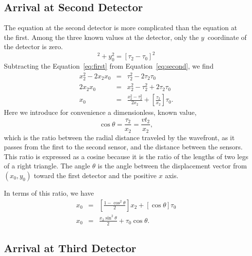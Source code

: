 \documentclass[twocolumn]{article}
\begin{document}
\subsection{Arrival at Second Detector}

The equation at the second detector is more complicated than the equation at
the first.  Among the three known values at the detector, only the
$y$~coordinate of the detector is zero.
\begin{equation}
   [x_2 - x_0]^2 + y_0^2 = [\tau_2 - \tau_0]^2
   \label{eq:second}
\end{equation}
Subtracting the Equation~\ref{eq:first} from Equation~\ref{eq:second}, we find
\begin{eqnarray}
   \nonumber
   x_2^2 - 2 x_2 x_0 &=& \tau_2^2 - 2 \tau_2 \tau_0\\
   \nonumber
   2 x_2 x_0 &=& x_2^2 - \tau_2^2 + 2 \tau_2 \tau_0\\
   x_0 &=& \frac{x_2^2 - \tau_2^2}{2 x_2} + \left[\frac{\tau_2}{x_2}\right]
   \tau_0.
\end{eqnarray}
Here we introduce for convenience a dimensionless, known value,
\begin{equation}
   \cos\theta = \frac{\tau_2}{x_2} = \frac{v t_2}{x_2},
\end{equation}
which is the ratio between the radial distance traveled by the wavefront, as it
passes from the first to the second sensor, and the distance between the
sensors.  This ratio is expressed as a cosine because it is the ratio of the
lengths of two legs of a right triangle.  The angle $\theta$ is the angle
between the displacement vector from $(x_0, y_0)$ toward the first detector and
the positive $x$ axis.

In terms of this ratio, we have
\begin{eqnarray}
   x_0 &=& \left[\frac{1 - \cos^2\theta}{2}\right] x_2 + [\cos\theta]\tau_0\\
   x_0 &=& \frac{x_2 \sin^2\theta}{2} + \tau_0\cos\theta.
   \label{eq:t-x}
\end{eqnarray}

\subsection{Arrival at Third Detector}
\end{document}
